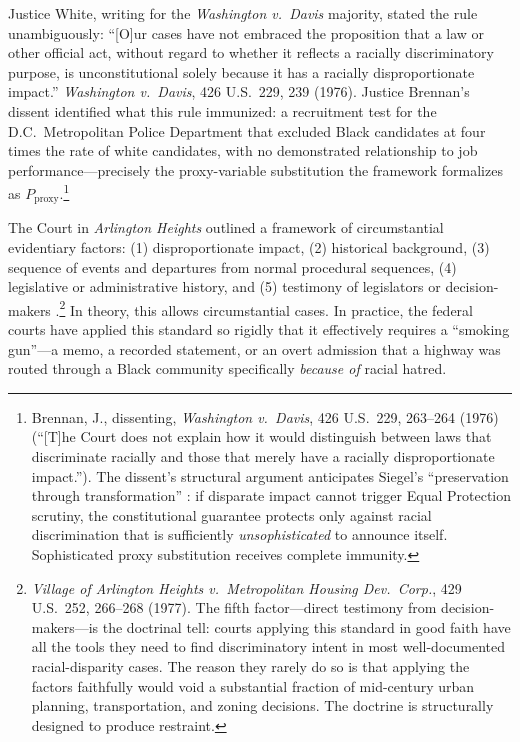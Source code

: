Justice White, writing for the \textit{Washington v.\ Davis} majority, stated the rule unambiguously: ``[O]ur cases have not embraced the proposition that a law or other official act, without regard to whether it reflects a racially discriminatory purpose, is unconstitutional solely because it has a racially disproportionate impact.'' \textit{Washington v.\ Davis}, 426 U.S.\ 229, 239 (1976). Justice Brennan's dissent identified what this rule immunized: a recruitment test for the D.C.\ Metropolitan Police Department that excluded Black candidates at four times the rate of white candidates, with no demonstrated relationship to job performance---precisely the proxy-variable substitution the framework formalizes as $P_{\text{proxy}}$.\footnote{Brennan, J., dissenting, \textit{Washington v.\ Davis}, 426 U.S.\ 229, 263--264 (1976) (``[T]he Court does not explain how it would distinguish between laws that discriminate racially and those that merely have a racially disproportionate impact.''). The dissent's structural argument anticipates Siegel's ``preservation through transformation'' \cite{tel_siegel}: if disparate impact cannot trigger Equal Protection scrutiny, the constitutional guarantee protects only against racial discrimination that is sufficiently \textit{unsophisticated} to announce itself. Sophisticated proxy substitution receives complete immunity.}

The Court in \textit{Arlington Heights} outlined a framework of circumstantial evidentiary factors: (1) disproportionate impact, (2) historical background, (3) sequence of events and departures from normal procedural sequences, (4) legislative or administrative history, and (5) testimony of legislators or decision-makers \cite{tel_arlington_heights}.\footnote{\textit{Village of Arlington Heights v.\ Metropolitan Housing Dev.\ Corp.}, 429 U.S.\ 252, 266--268 (1977). The fifth factor---direct testimony from decision-makers---is the doctrinal tell: courts applying this standard in good faith have all the tools they need to find discriminatory intent in most well-documented racial-disparity cases. The reason they rarely do so is that applying the factors faithfully would void a substantial fraction of mid-century urban planning, transportation, and zoning decisions. The doctrine is structurally designed to produce restraint.} In theory, this allows circumstantial cases. In practice, the federal courts have applied this standard so rigidly that it effectively requires a ``smoking gun''---a memo, a recorded statement, or an overt admission that a highway was routed through a Black community specifically \textit{because of} racial hatred.


